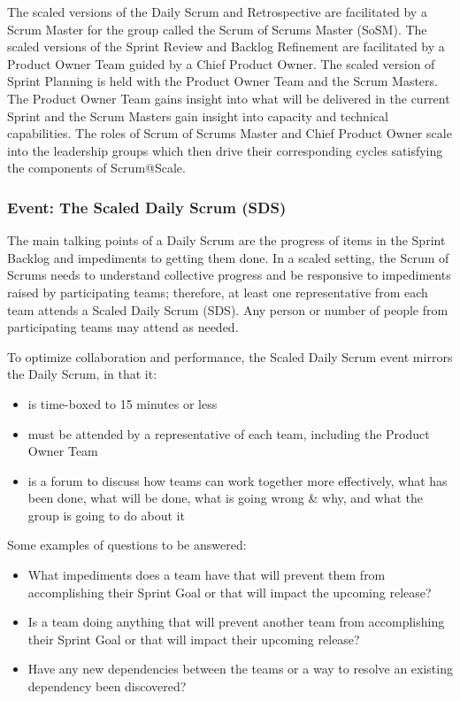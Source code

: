 \documentclass[12pt,a4paper,parskip=full]{scrartcl}
\begin{document}
The scaled versions of the Daily Scrum and Retrospective are facilitated
by a Scrum Master for the group called the Scrum of Scrums Master
(SoSM). The scaled versions of the Sprint Review and Backlog Refinement
are facilitated by a Product Owner Team guided by a Chief Product Owner.
The scaled version of Sprint Planning is held with the Product Owner
Team and the Scrum Masters. The Product Owner Team gains insight into
what will be delivered in the current Sprint and the Scrum Masters gain
insight into capacity and technical capabilities. The roles of Scrum of
Scrums Master and Chief Product Owner scale into the leadership groups
which then drive their corresponding cycles satisfying the components of
Scrum@Scale.

\subsubsection{Event: The Scaled Daily Scrum
(SDS)}\label{event-the-scaled-daily-scrum}

The main talking points of a Daily Scrum are the progress of items in
the Sprint Backlog and impediments to getting them done. In a scaled
setting, the Scrum of Scrums needs to understand collective progress and
be responsive to impediments raised by participating teams; therefore,
at least one representative from each team attends a Scaled Daily Scrum
(SDS). Any person or number of people from participating teams may
attend as needed.

To optimize collaboration and performance, the Scaled Daily Scrum event
mirrors the Daily Scrum, in that it:

\begin{itemize}
\itemsep1pt\parskip0pt
\item
  is time-boxed to 15 minutes or less
\item
  must be attended by a representative of each team, including the
  Product Owner Team
\item
  is a forum to discuss how teams can work together more effectively,
  what has been done, what will be done, what is going wrong \& why, and
  what the group is going to do about it
\end{itemize}

Some examples of questions to be answered:

\begin{itemize}
\itemsep1pt\parskip0pt
\item
  What impediments does a team have that will prevent them from
  accomplishing their Sprint Goal or that will impact the upcoming
  release?
\item
  Is a team doing anything that will prevent another team from
  accomplishing their Sprint Goal or that will impact their upcoming
  release?
\item
  Have any new dependencies between the teams or a way to resolve an
  existing dependency been discovered?
\end{itemize}
\end{document}
